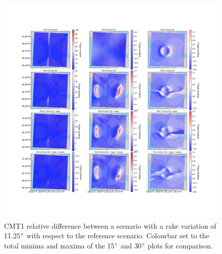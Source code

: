 \documentclass[../Text/00main.tex]{subfiles}
\begin{document}
\begin{figure}[h]
    \centering
    \includegraphics[width=1\linewidth,trim = 2cm 5cm 1cm 5cm, clip]{images_results/rake_variation_epsilon12_sc1.png}
    \caption{CMT1 relative difference between a scenario with a rake variation of 11.25$\degree$ with respect to the reference scenario. Colourbar set to the total minima and maxima of the 15$\degree$ and 30$\degree$ plots for comparison.}
    \label{fig:ref_eps12-1_rake}
\end{figure}
\end{document}
